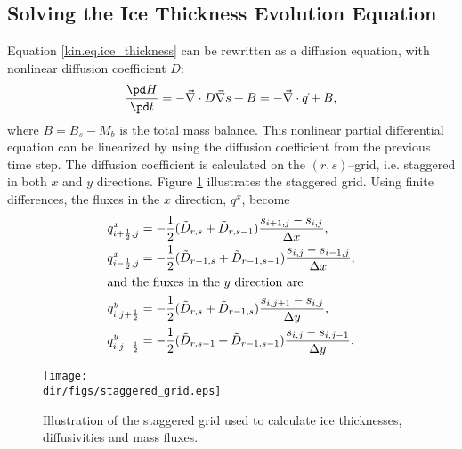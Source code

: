 \subsection{Solving the Ice Thickness Evolution Equation}
Equation \eqref{kin.eq.ice_thickness} can be rewritten as a diffusion equation, with nonlinear diffusion coefficient $D$:
\begin{equation}
  \label{kin.eq.ice_evo}
  \frac{\pd H}{\pd t}=-\vec\nabla\cdot D\vec\nabla s+B=-\vec\nabla\cdot\vec q+B,
\end{equation}
where $B = B_s - M_b$ is the total mass balance.
This nonlinear partial differential equation can be linearized by using the diffusion coefficient from the previous time step. The diffusion coefficient is calculated on the $(r,s)$--grid, i.e. staggered in both $x$ and $y$ directions. Figure \ref{kin.fig.staggered_grid} illustrates the staggered grid. Using finite differences, the fluxes in the $x$ direction, $q^x$, become
\begin{subequations}
\begin{align}
  q^x_{i+\frac12,j}&=-\frac12(\tilde{D}_{r,s}+\tilde{D}_{r,s-1})\frac{s_{i+1,j}-s_{i,j}}{\Delta x},\\
  q^x_{i-\frac12,j}&=-\frac12(\tilde{D}_{r-1,s}+\tilde{D}_{r-1,s-1})\frac{s_{i,j}-s_{i-1,j}}{\Delta x},\\
  \intertext{and the fluxes in the $y$ direction are}
  q^y_{i,j+\frac12}&=-\frac12(\tilde{D}_{r,s}+\tilde{D}_{r-1,s})\frac{s_{i,j+1}-s_{i,j}}{\Delta y},\\
  q^y_{i,j-\frac12}&=-\frac12(\tilde{D}_{r,s-1}+\tilde{D}_{r-1,s-1})\frac{s_{i,j}-s_{i,j-1}}{\Delta y}.
\end{align}  
\end{subequations}

\begin{figure}[htbp]
  \centering
  \texttt{[image: \\dir/figs/staggered\_grid.eps]}
  \caption{Illustration of the staggered grid used to calculate ice thicknesses, diffusivities and mass fluxes.}
  \label{kin.fig.staggered_grid}
\end{figure}

